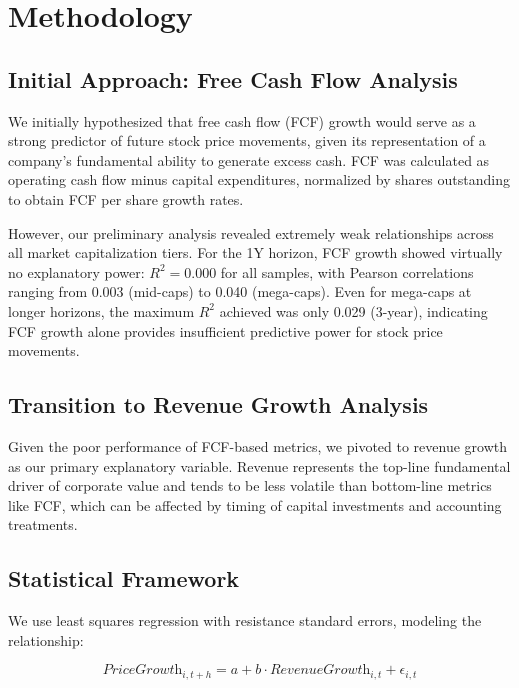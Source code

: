 \documentclass[11pt]{article}
\begin{document}
\section{Methodology}

\subsection{Initial Approach: Free Cash Flow Analysis}

We initially hypothesized that free cash flow (FCF) growth would serve as a strong predictor of future stock price movements, given its representation of a company's fundamental ability to generate excess cash. FCF was calculated as operating cash flow minus capital expenditures, normalized by shares outstanding to obtain FCF per share growth rates.

However, our preliminary analysis revealed extremely weak relationships across all market capitalization tiers. For the 1Y horizon, FCF growth showed virtually no explanatory power: $R^2 = 0.000$ for all samples, with Pearson correlations ranging from 0.003 (mid-caps) to 0.040 (mega-caps). Even for mega-caps at longer horizons, the maximum $R^2$ achieved was only 0.029 (3-year), indicating FCF growth alone provides insufficient predictive power for stock price movements.

\subsection{Transition to Revenue Growth Analysis}

Given the poor performance of FCF-based metrics, we pivoted to revenue growth as our primary explanatory variable. Revenue represents the top-line fundamental driver of corporate value and tends to be less volatile than bottom-line metrics like FCF, which can be affected by timing of capital investments and accounting treatments.

\subsection{Statistical Framework}

We use least squares regression with resistance standard errors, modeling the relationship:

\begin{equation}
\textit{PriceGrowth}_{i,t+h} = a + b \cdot \textit{RevenueGrowth}_{i,t} + \epsilon_{i,t}
\end{equation}
\end{document}
